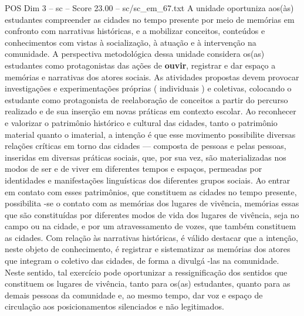\begin{textsample}{POS Dim 3 – sc – Score 23.00 – sc/sc\_em\_67.txt}
A unidade oportuniza aos(às) estudantes compreender as cidades no tempo presente por meio de memórias em confronto com narrativas históricas, e a mobilizar conceitos, conteúdos e conhecimentos com vistas à socialização, à atuação e à intervenção na comunidade.
A perspectiva metodológica dessa unidade considera os(as) estudantes como protagonistas das ações de \textbf{ouvir}, registrar e dar espaço a memórias e narrativas dos atores sociais.
As atividades propostas devem provocar investigações e experimentações próprias ( individuais ) e coletivas, colocando o estudante como protagonista de reelaboração de conceitos a partir do percurso realizado e de sua inserção em novas práticas em contexto escolar.
Ao reconhecer e valorizar o patrimônio histórico e cultural das cidades, tanto o patrimônio material quanto o imaterial, a intenção é que esse movimento possibilite diversas relações críticas em torno das cidades — composta de pessoas e pelas pessoas, inseridas em diversas práticas sociais, que, por sua vez, são materializadas nos modos de ser e de viver em diferentes tempos e espaços, permeadas por identidades e manifestações linguísticas dos diferentes grupos sociais.
Ao entrar em contato com esses patrimônios, que constituem as cidades no tempo presente, possibilita -se o contato com as memórias dos lugares de vivência, memórias essas que são constituídas por diferentes modos de vida dos lugares de vivência, seja no campo ou na cidade, e por um atravessamento de vozes, que também constituem as cidades.
Com relação às narrativas históricas, é válido destacar que a intenção, neste objeto de conhecimento, é registrar e sistematizar as memórias dos atores que integram o coletivo das cidades, de forma a divulgá -las na comunidade.
Neste sentido, tal exercício pode oportunizar a ressignificação dos sentidos que constituem os lugares de vivência, tanto para os(as) estudantes, quanto para as demais pessoas da comunidade e, ao mesmo tempo, dar voz e espaço de circulação aos posicionamentos silenciados e não legitimados.

\end{textsample}
